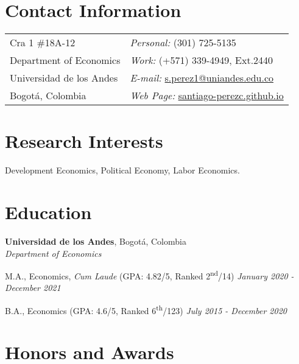 \documentclass[margin,line]{res}
\newenvironment{list1}{
  \begin{list}{\ding{113}}{%
      \setlength{\itemsep}{0in}
      \setlength{\parsep}{0in} \setlength{\parskip}{0in}
      \setlength{\topsep}{0in} \setlength{\partopsep}{0in} 
      \setlength{\leftmargin}{0.17in}}}{\end{list}}
\begin{document}

\begin{resume}
\section{\sc Contact Information}
\vspace{.05in}
\begin{tabular}{@{}p{3in}p{3in}}
Cra 1 \#18A-12             & {\it Personal:}  (301) 725-5135 \\            
Department of Economics   & {\it Work:}    (+571) 339-4949, Ext.2440  \\         
Universidad de los Andes & {\it E-mail:}  \href{mailto:s.perez1@uniandes.edu.co}{s.perez1@uniandes.edu.co}\\       
Bogotá, Colombia  & {\it Web Page:} \href{https://santiago-perezc.github.io}{santiago-perezc.github.io}  \\   
\end{tabular}


\section{\sc Research Interests}
Development Economics, Political Economy, Labor Economics.

\section{\sc Education}

{\bf Universidad de los Andes}, Bogotá, Colombia\\
{\em Department of Economics} \\
\begin{list1}

\item[]M.A., Economics, \textit{Cum Laude} (GPA: 4.82/5, Ranked 2\textsuperscript{nd}/14) \hfill  {\it January 2020 - December 2021}
\item[] B.A., Economics (GPA: 4.6/5, Ranked 6\textsuperscript{th}/123) \hfill {\it July 2015 - December 2020}

\end{list1}

\vspace{.1cm}

\section{\sc Honors and Awards} 


\end{resume}
\end{document}
